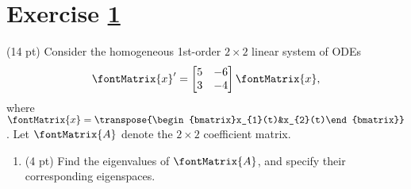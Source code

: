 \newpage





%
%
%
%


\section{Exercise \ref{sec : Math211 Summer2019 Exam4 Q8}}
\label{sec : Math211 Summer2019 Exam4 Q8}

(14 pt) Consider the homogeneous 1st-order $2 \times 2$ linear system of ODEs
\begin{align}
\fontMatrix{x}'
=
\begin{bmatrix}%
5	&	-6	\\
3	&	-4
\end{bmatrix}%
\fontMatrix{x}
,%
\label{eq : E4Q8 ODE}
\end{align}
where $\fontMatrix{x} = \transpose{\begin{bmatrix}x_{1}(t)&x_{2}(t)\end{bmatrix}}$. Let $\fontMatrix{A}$ denote the $2 \times 2$ coefficient matrix.




\begin{enumerate}[label=(\alph*)]
\item\label{itm : E4Q8a} (4 pt) Find the eigenvalues of $\fontMatrix{A}$, and specify their corresponding eigenspaces.
\end{enumerate}

